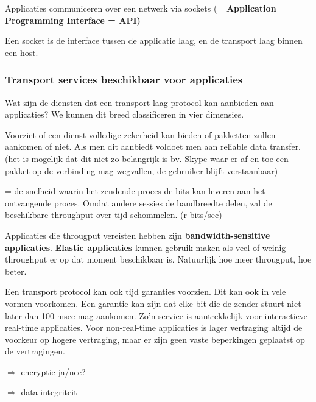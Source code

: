 \noindent Applicaties communiceren over een netwerk via sockets (= \textbf{Application Programming Interface = API)}

\noindent Een socket is de interface tussen de applicatie laag, en de transport laag binnen een host.

\subsubsection{Transport services beschikbaar voor applicaties}

\noindent Wat zijn de diensten dat een transport laag protocol kan aanbieden aan applicaties? We kunnen dit breed classificeren in vier dimensies.


Voorziet of een dienst volledige zekerheid kan bieden of pakketten zullen aankomen of niet. Als men dit aanbiedt voldoet men aan reliable data transfer.(het is mogelijk dat dit niet zo belangrijk is bv. Skype waar er af en toe een pakket op de verbinding mag wegvallen, de gebruiker blijft verstaanbaar)


= de snelheid waarin het zendende proces de bits kan leveren aan het ontvangende proces. Omdat andere sessies de bandbreedte delen, zal de beschikbare throughput over tijd schommelen. (r bits/sec)

\noindent Applicaties die througput vereisten hebben zijn \textbf{bandwidth-sensitive applicaties}. 
\noindent \textbf{Elastic applicaties} kunnen gebruik maken als veel of weinig throughput er op dat moment beschikbaar is. Natuurlijk hoe meer througput, hoe beter.


Een transport protocol kan ook tijd garanties voorzien. Dit kan ook in vele vormen voorkomen. Een garantie kan zijn dat elke bit die de zender stuurt niet later dan 100 msec mag aankomen. Zo’n service is aantrekkelijk voor interactieve real-time applicaties. Voor non-real-time applicaties is lager vertraging altijd de voorkeur op hogere vertraging, maar er zijn geen vaste beperkingen geplaatst op de vertragingen.


\noindent $\Rightarrow$ encryptie ja/nee?

\noindent $\Rightarrow$ data integriteit

